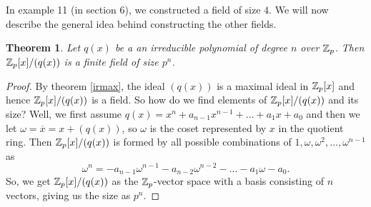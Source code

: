 \documentclass[12pt]{article}
\theoremstyle{plain}
\newtheorem{theorem}{Theorem}
\theoremstyle{definition}
\theoremstyle{remark}
\begin{document}
In example 11 (in section 6), we constructed a field of size $4$. We will now describe the general idea behind constructing the other fields.
\begin{theorem}
Let $q(x)$ be a an irreducible polynomial of degree $n$ over $\mathbb{Z}_p$. Then $\mathbb{Z}_p[x]/(q(x))$ is a finite field of size $p^n$.
\end{theorem}
\begin{proof}
By theorem \ref{irmax}, the ideal $(q(x))$ is a maximal ideal in $\mathbb{Z}_p[x]$ and hence $\mathbb{Z}_p[x]/(q(x))$ is a field. So how do we find elements of $\mathbb{Z}_p[x]/(q(x))$ and its size? Well, we first assume $q(x)=x^n+a_{n-1}x^{n-1}+\dots +a_1x+a_0$ and then we let $\omega=\overline{x}=x+(q(x))$, so $\omega$ is the coset represented by $x$ in the quotient ring. Then $\mathbb{Z}_p[x]/(q(x))$ is formed by all possible combinations of $1, \omega, \omega^2, \dots, \omega^{n-1}$ as
$$\omega^n=-a_{n-1}\omega^{n-1}-a_{n-2}\omega^{n-2}-\dots -a_1\omega-a_0.$$
So, we get $\mathbb{Z}_p[x]/(q(x))$ as the $\mathbb{Z}_p$-vector space with a basis consisting of $n$ vectors, giving us the size as $p^n$.
\end{proof}
\end{document}
